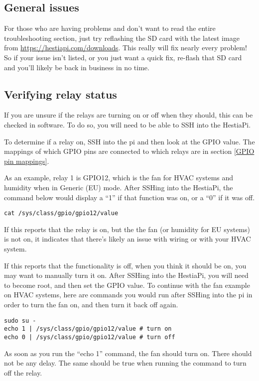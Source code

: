 \subsection{General issues}
For those who are having problems and don't want to read the entire
troubleshooting section, just try reflashing the SD card with the latest image
from \url{https://hestiapi.com/downloads}. This really will fix nearly every
problem! So if your issue isn't listed, or you just want a quick fix, re-flash
that SD card and you'll likely be back in business in no time.

\subsection{Verifying relay status} \label{Verifying relay status}
If you are unsure if the relays are turning on or off when they should, this
can be checked in software. To do so, you will need to be able to SSH into the
HestiaPi.

To determine if a relay on, SSH into the pi and then look at the GPIO value.
The mappings of which GPIO pins are connected to which relays are in section
\ref{GPIO pin mappings}.

As an example, relay 1 is GPIO12, which is the fan for HVAC systems and
humidity when in Generic (EU) mode. After SSHing into the HestiaPi, the command
below would display a ``1'' if that function was on, or a ``0'' if it was off.

\texttt{cat /sys/class/gpio/gpio12/value}

If this reports that the relay is on, but the the fan (or humidity for EU
systems) is not on, it indicates that there's likely an issue with wiring or
with your HVAC system.

If this reports that the functionality is off, when you think it should be on,
you may want to manually turn it on. After SSHing into the HestiaPi, you will
need to become root, and then set the GPIO value. To continue with the fan
example on HVAC systems, here are commands you would run after SSHing into the
pi in order to turn the fan on, and then turn it back off again.

\texttt{sudo su -\\
echo 1 | /sys/class/gpio/gpio12/value \# turn on\\
echo 0 | /sys/class/gpio/gpio12/value \# turn off\\
}

As soon as you run the ``echo 1'' command, the fan should turn on. There should
not be any delay. The same should be true when running the command to turn off
the relay.

